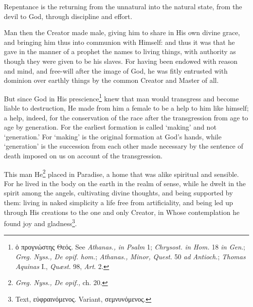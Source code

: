 Repentance is the returning from the unnatural into the natural state, from the devil to God, through discipline and effort.

Man then the Creator made male, giving him to share in His own divine grace, and bringing him thus into communion with Himself: and thus it was that he gave in the manner of a prophet the names to living things, with authority as though they were given to be his slaves. For having been endowed with reason and mind, and free-will after the image of God, he was fitly entrusted with dominion over earthly things by the common Creator and Master of all.

But since God in His prescience\footnote{\textgreek{ὁ προγνώστης Θεός}. See \emph{Athanas., in Psalm }1; \emph{Chrysost. in Hom. }18 \emph{in Gen}.; \emph{Greg. Nyss., De opif. hom.}; \emph{Athanas., Minor, Quest. }50 \emph{ad Antioch.}; \emph{Thomas Aquinas }I., \emph{Quæst. }98, \emph{Art}. 2.} knew that man would transgress and become liable to destruction, He made from him a female to be a help to him like himself; a help, indeed, for the conservation of the race after the transgression from age to age by generation. For the earliest formation is called ‘making’ and not ‘generation.’ For ‘making’ is the original formation at God’s hands, while ‘generation’ is the succession from each other made necessary by the sentence of death imposed on us on account of the transgression.

This man He\footnote{\emph{Greg. Nyss., De opif., }ch. 20.} placed in Paradise, a home that was alike spiritual and sensible. For he lived in the body on the earth in the realm of sense, while he dwelt in the spirit among the angels, cultivating divine thoughts, and being supported by them: living in naked simplicity a life free from artificiality, and being led up through His creations to the one and only Creator, in Whose contemplation he found joy and gladness\footnote{Text, \textgreek{εὐφραινόμενος}. Variant, \textgreek{σεμνυνόμενος}.}.

